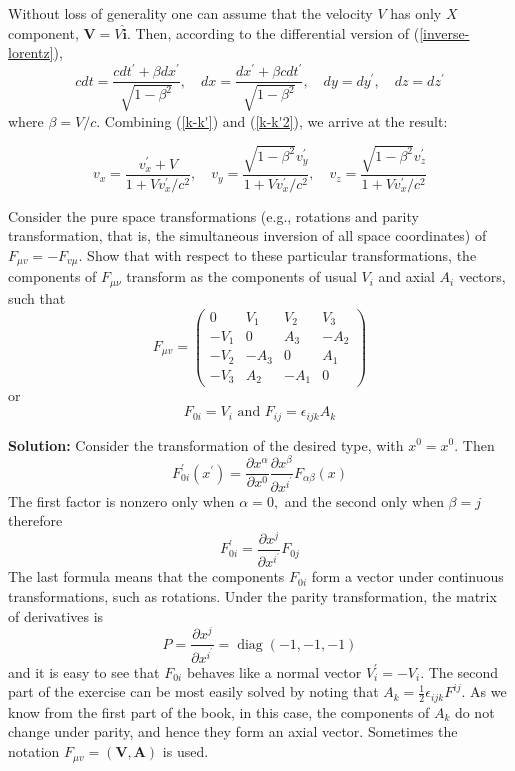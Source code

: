 Without loss of generality one can assume that the velocity $V$ has only $X$ component, $\mathbf{V}=V \hat{\mathbf{i}} .$ Then, according to the differential version of (\ref{inverse-lorentz}),
\begin{equation}
    c d t=\frac{c d t^{\prime}+\beta d x^{\prime}}{\sqrt{1-\beta^{2}}}, \quad d x=\frac{d x^{\prime}+\beta c d t^{\prime}}{\sqrt{1-\beta^{2}}}, \quad d y=d y^{\prime}, \quad d z=d z^{\prime}
    \label{k-k'2}
\end{equation}
where $\beta=V/c$. Combining (\ref{k-k'}) and (\ref{k-k'2}), we arrive at the result:
\begin{qt}
    \begin{equation}
v_{x}=\frac{v_{x}^{\prime}+V}{1+V v_{x}^{\prime} / c^{2}}, \quad v_{y}=\frac{\sqrt{1-\beta^{2}} v_{y}^{\prime}}{1+V v_{x}^{\prime} / c^{2}}, \quad v_{z}=\frac{\sqrt{1-\beta^{2}} v_{z}^{\prime}}{1+V v_{x}^{\prime} / c^{2}}
\end{equation}
\end{qt}
\begin{example}
 Consider the pure space transformations (e.g., rotations and parity transformation, that is, the simultaneous inversion of all space coordinates) of $F_{\mu v}=-F_{v \mu} .$ Show that with respect to these particular transformations, the components of $F_{\mu\nu}$ transform as the components of usual $V_i$ and axial $A_i$ vectors, such that
 \begin{equation}
F_{\mu v}=\left(\begin{array}{cccc}
{0} & {V_{1}} & {V_{2}} & {V_{3}} \\
{-V_{1}} & {0} & {A_{3}} & {-A_{2}} \\
{-V_{2}}&{-A_{3}} & {0} & {A_{1}} \\
{-V_{3}} & {A_{2}} & {-A_{1}} & {0}
\end{array}\right)
\end{equation}
or 
\begin{equation}
 F_{0 i}=V_{i} \text { and } F_{i j}=\epsilon_{i j k} A_{k}
\end{equation}
\end{example}
\textbf{Solution:}
Consider the transformation of the desired type, with $x^{0}=x^{0} .$ Then
$$
F_{0 i}^{\prime}\left(x^{\prime}\right)=\frac{\partial x^{\alpha}}{\partial x^{0}} \frac{\partial x^{\beta}}{\partial x^{i^{\prime}}} F_{\alpha \beta}(x)
$$
The first factor is nonzero only when $\alpha=0,$ and the second only when $\beta=j$ therefore
$$
F_{0 i}^{\prime}=\frac{\partial x^{j}}{\partial x^{i^{\prime}}} F_{0 j}
$$
The last formula means that the components $F_{0 i}$ form a vector under continuous transformations, such as rotations. Under the parity transformation, the matrix of derivatives is
$$
P=\frac{\partial x^{j}}{\partial x^{i^{\prime}}}=\operatorname{diag}(-1,-1,-1)
$$
and it is easy to see that $F_{0 i}$ behaves like a normal vector $V_{i}^{\prime}=-V_{i} .$ The second part of the exercise can be most easily solved by noting that $A_{k}=\frac{1}{2} \epsilon_{i j k} F^{i j} .$ As we know from the first part of the book, in this case, the components of $A_{k}$ do not change under parity, and hence they form an axial vector. Sometimes the notation $F_{\mu v}=(\mathbf{V}, \mathbf{A})$ is used.

